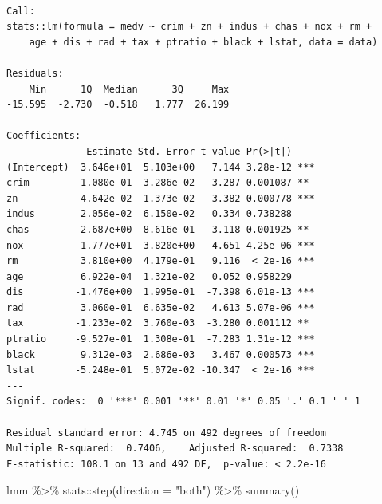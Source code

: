 \documentclass[
  letterpaper,
  DIV=11,
  numbers=noendperiod]{scrreprt}
\newenvironment{Shaded}{\begin{snugshade}}{\end{snugshade}}
\newcommand{\AttributeTok}[1]{\textcolor[rgb]{0.65,0.35,0.00}{#1}}
\newcommand{\FunctionTok}[1]{\textcolor[rgb]{0.02,0.16,0.49}{#1}}
\newcommand{\NormalTok}[1]{\textcolor[rgb]{0.33,0.33,0.33}{#1}}
\newcommand{\SpecialCharTok}[1]{\textcolor[rgb]{0.00,0.46,0.62}{#1}}
\newcommand{\StringTok}[1]{\textcolor[rgb]{0.00,0.50,0.00}{#1}}
\begin{document}
\begin{verbatim}

Call:
stats::lm(formula = medv ~ crim + zn + indus + chas + nox + rm + 
    age + dis + rad + tax + ptratio + black + lstat, data = data)

Residuals:
    Min      1Q  Median      3Q     Max 
-15.595  -2.730  -0.518   1.777  26.199 

Coefficients:
              Estimate Std. Error t value Pr(>|t|)    
(Intercept)  3.646e+01  5.103e+00   7.144 3.28e-12 ***
crim        -1.080e-01  3.286e-02  -3.287 0.001087 ** 
zn           4.642e-02  1.373e-02   3.382 0.000778 ***
indus        2.056e-02  6.150e-02   0.334 0.738288    
chas         2.687e+00  8.616e-01   3.118 0.001925 ** 
nox         -1.777e+01  3.820e+00  -4.651 4.25e-06 ***
rm           3.810e+00  4.179e-01   9.116  < 2e-16 ***
age          6.922e-04  1.321e-02   0.052 0.958229    
dis         -1.476e+00  1.995e-01  -7.398 6.01e-13 ***
rad          3.060e-01  6.635e-02   4.613 5.07e-06 ***
tax         -1.233e-02  3.760e-03  -3.280 0.001112 ** 
ptratio     -9.527e-01  1.308e-01  -7.283 1.31e-12 ***
black        9.312e-03  2.686e-03   3.467 0.000573 ***
lstat       -5.248e-01  5.072e-02 -10.347  < 2e-16 ***
---
Signif. codes:  0 '***' 0.001 '**' 0.01 '*' 0.05 '.' 0.1 ' ' 1

Residual standard error: 4.745 on 492 degrees of freedom
Multiple R-squared:  0.7406,    Adjusted R-squared:  0.7338 
F-statistic: 108.1 on 13 and 492 DF,  p-value: < 2.2e-16
\end{verbatim}

\begin{Shaded}
\begin{Highlighting}[]
\NormalTok{lmm }\SpecialCharTok{\%\textgreater{}\%}\NormalTok{ stats}\SpecialCharTok{::}\FunctionTok{step}\NormalTok{(}\AttributeTok{direction =} \StringTok{"both"}\NormalTok{) }\SpecialCharTok{\%\textgreater{}\%} \FunctionTok{summary}\NormalTok{()}
\end{Highlighting}
\end{Shaded}
\end{document}
